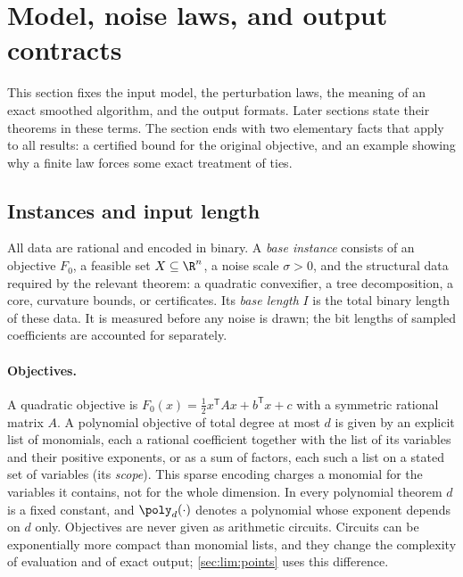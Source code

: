 \section{Model, noise laws, and output contracts}\label{sec:model}

This section fixes the input model, the perturbation laws, the meaning of
an exact smoothed algorithm, and the output formats. Later sections state
their theorems in these terms. The section ends with two elementary facts
that apply to all results: a certified bound for the original objective, and
an example showing why a finite law forces some exact treatment of ties.

\subsection{Instances and input length}\label{sec:model:input}

All data are rational and encoded in binary. A \emph{base instance}
consists of an objective $F_0$, a feasible set $X\subseteq\R^n$, a noise
scale $\sigma>0$, and the structural data required by the relevant theorem:
a quadratic convexifier, a tree decomposition, a core, curvature bounds, or
certificates. Its \emph{base length} $I$ is the total binary length of these
data. It is measured before any noise is drawn; the bit lengths of sampled
coefficients are accounted for separately.

\paragraph{Objectives.}
A quadratic objective is $F_0(x)=\frac12x^{\mathsf T}Ax+b^{\mathsf T}x+c$
with a symmetric rational matrix $A$. A polynomial objective of total degree
at most $d$ is given by an explicit list of monomials, each a rational
coefficient together with the list of its variables and their positive
exponents, or as a sum of factors, each such a list on a stated set of
variables (its \emph{scope}). This sparse encoding charges a monomial for the
variables it contains, not for the whole dimension. In every polynomial theorem
$d$ is a fixed constant, and $\poly_d(\cdot)$ denotes a polynomial whose
exponent depends on $d$ only. Objectives are never given as arithmetic
circuits. Circuits can be exponentially more compact than monomial lists,
and they change the complexity of evaluation and of exact output;
\cref{sec:lim:points} uses this difference.

